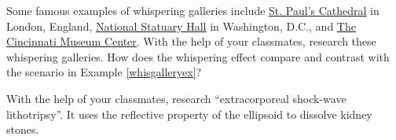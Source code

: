 \documentclass{ximera}
\begin{document}
\begin{problem}
    Some famous examples of whispering galleries include \href{http://www.stpauls.co.uk/}{\underline{St. Paul's Cathedral}} in London, England, \href{http://www.aoc.gov/cc/capitol/nat_stat_hall.cfm}{\underline{National Statuary Hall}} in Washington, D.C.,  and \href{http://www.cincymuseum.org/}{\underline{The Cincinnati Museum Center}}. With the help of your classmates, research these whispering galleries.  How does the whispering effect compare and contrast with the scenario in Example  \ref{whisgalleryex}?
\end{problem}

\begin{problem}
     With the help of your classmates, research ``extracorporeal shock-wave lithotripsy''.  It uses the reflective property of the ellipsoid to dissolve kidney stones.
\end{problem}
\end{document}
